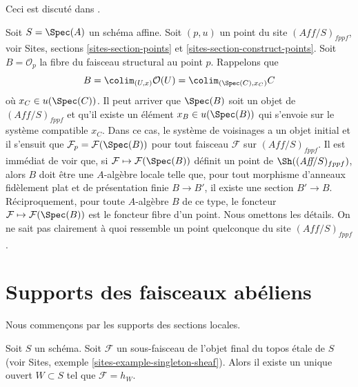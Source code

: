 \begin{remark}
\label{remark-points-fppf-site}
\begin{reference}
Ceci est discut\'e dans \cite{Schroeer}.
\end{reference}
Soit $S = \Spec(A)$ un sch\'ema affine. Soit $(p, u)$ un point du
site $(\textit{Aff}/S)_{fppf}$, voir
Sites, sections \ref{sites-section-points} et
\ref{sites-section-construct-points}. Soit $B = \mathcal{O}_p$ la fibre
du faisceau structural au point $p$. Rappelons que
$$
B = \colim_{(U, x)} \mathcal{O}(U) =
\colim_{(\Spec(C), x_C)} C
$$
o\`u $x_C \in u(\Spec(C))$. Il peut arriver que
$\Spec(B)$ soit un objet de $(\textit{Aff}/S)_{fppf}$
et qu'il existe un \'el\'ement $x_B \in u(\Spec(B))$ qui s'envoie sur
le syst\`eme compatible $x_C$. Dans ce cas, le syst\`eme de voisinages
a un objet initial et il s'ensuit que
$\mathcal{F}_p = \mathcal{F}(\Spec(B))$ pour tout faisceau $\mathcal{F}$
sur $(\textit{Aff}/S)_{fppf}$. Il est imm\'ediat
de voir que, si $\mathcal{F} \mapsto \mathcal{F}(\Spec(B))$ d\'efinit un point
de $\Sh((\textit{Aff}/S)_{fppf})$, alors
$B$ doit \^etre une $A$-alg\`ebre locale telle que, pour tout morphisme d'anneaux
fid\`element plat et de pr\'esentation finie $B \to B'$, il existe une section $B' \to B$.
R\'eciproquement, pour toute $A$-alg\`ebre $B$ de ce type, le foncteur
$\mathcal{F} \mapsto \mathcal{F}(\Spec(B))$ est le foncteur fibre
d'un point. Nous omettons les d\'etails. On ne sait pas clairement \`a quoi ressemble un point quelconque du
site $(\textit{Aff}/S)_{fppf}$.
\end{remark}











\section{Supports des faisceaux ab\'eliens}
\label{section-support}

\noindent
Nous commen\c{c}ons par les supports des sections locales.

\begin{lemma}
\label{lemma-support-subsheaf-final}
Soit $S$ un sch\'ema. Soit $\mathcal{F}$ un sous-faisceau de l'objet
final du topos \'etale de $S$ (voir
Sites, exemple \ref{sites-example-singleton-sheaf}).
Alors il existe un unique ouvert
$W \subset S$ tel que $\mathcal{F} = h_W$.
\end{lemma}

